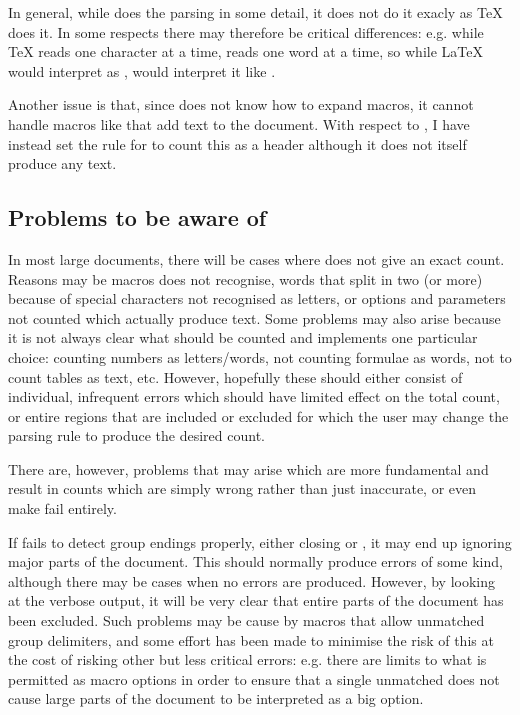 \documentclass{article}
\begin{document}
In general, while \TeXcount{} does the parsing in some detail, it does not do it exacly as \TeX{} does it. In some respects there may therefore be critical differences: e.g. while \TeX{} reads one character at a time, \TeXcount{} reads one word at a time, so while \LaTeX{} would interpret  as , \TeXcount{} would interpret it like .

Another issue is that, since \TeXcount{} does not know how to expand macros, it cannot handle macros like  that add text to the document. With respect to , I have instead set the rule for  to count this as a header although it does not itself produce any text.

\subsection{Problems to be aware of}

In most large documents, there will be cases where \TeXcount{} does not give an exact count. Reasons may be macros \TeXcount{} does not recognise, words that \TeXcount{} split in two (or more) because of special characters not recognised as letters, or options and parameters not counted which actually produce text. Some problems may also arise because it is not always clear what should be counted and \TeXcount{} implements one particular choice: counting numbers as letters/words, not counting formulae as words, not to count tables as text, etc. However, hopefully these should either consist of individual, infrequent errors which should have limited effect on the total count, or entire regions that are included or excluded for which the user may change the parsing rule to produce the desired count.

There are, however, problems that may arise which are more fundamental and result in counts which are simply wrong rather than just inaccurate, or even make \TeXcount{} fail entirely.

If \TeXcount{} fails to detect group endings properly, either closing \code{\{} or , it may end up ignoring major parts of the document. This should normally produce errors of some kind, although there may be cases when no errors are produced. However, by looking at the verbose output, it will be very clear that entire parts of the document has been excluded. Such problems may be cause by macros that allow unmatched group delimiters, and some effort has been made to minimise the risk of this at the cost of risking other but less critical errors: e.g. there are limits to what is permitted as macro options in order to ensure that a single unmatched \code{[} does not cause large parts of the document to be interpreted as a big option.
\end{document}
